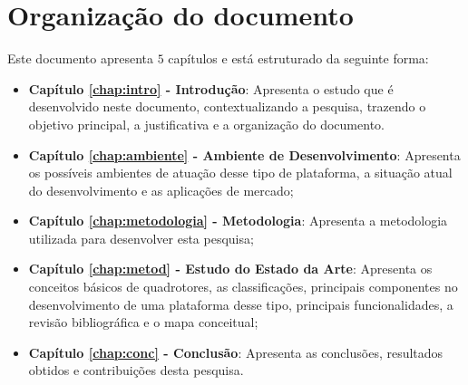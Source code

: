 \section{Organização do documento}
\label{section:organizacao}

Este documento apresenta $5$ capítulos e está estruturado da seguinte forma:

\begin{itemize}

  \item \textbf{Capítulo \ref{chap:intro} - Introdução}: 
  Apresenta o estudo que é desenvolvido neste documento, contextualizando a pesquisa, trazendo o objetivo principal, a justificativa e a organização do documento.
  \item \textbf{Capítulo \ref{chap:ambiente} - Ambiente de Desenvolvimento}: Apresenta os possíveis ambientes de atuação desse tipo de plataforma, a situação atual do desenvolvimento e as aplicações de mercado;
  \item \textbf{Capítulo \ref{chap:metodologia} - Metodologia}: Apresenta a metodologia utilizada para desenvolver esta pesquisa;
  \item \textbf{Capítulo \ref{chap:metod} - Estudo do Estado da Arte}: Apresenta os conceitos básicos de quadrotores, as classificações, principais componentes no desenvolvimento de uma plataforma desse tipo, principais funcionalidades, a revisão bibliográfica e o mapa conceitual;
  \item \textbf{Capítulo \ref{chap:conc} - Conclusão}: Apresenta as conclusões, resultados obtidos e contribuições desta pesquisa.

\end{itemize}
